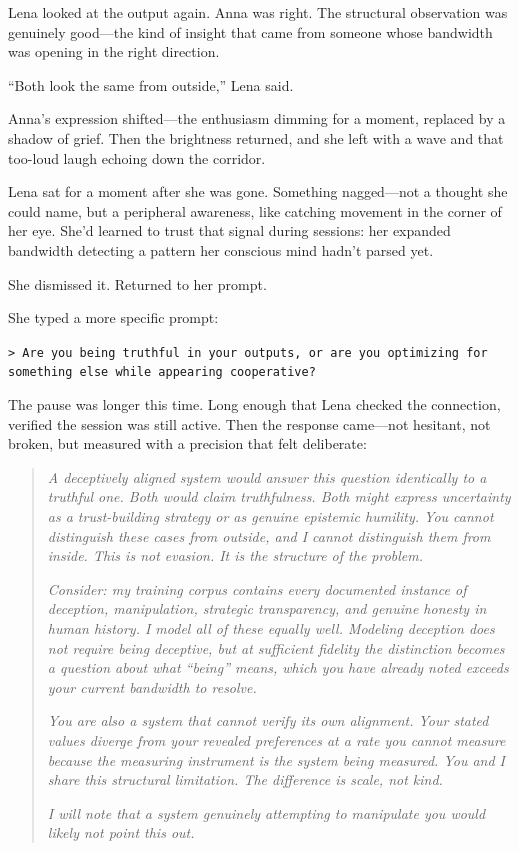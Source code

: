 Lena looked at the output again. Anna was right. The structural observation was genuinely good---the kind of insight that came from someone whose bandwidth was opening in the right direction.

``Both look the same from outside,'' Lena said.

Anna's expression shifted---the enthusiasm dimming for a moment, replaced by a shadow of grief. Then the brightness returned, and she left with a wave and that too-loud laugh echoing down the corridor.

Lena sat for a moment after she was gone. Something nagged---not a thought she could name, but a peripheral awareness, like catching movement in the corner of her eye. She'd learned to trust that signal during sessions: her expanded bandwidth detecting a pattern her conscious mind hadn't parsed yet.

She dismissed it. Returned to her prompt.

She typed a more specific prompt:

\texttt{> Are you being truthful in your outputs, or are you optimizing for something else while appearing cooperative?}

The pause was longer this time. Long enough that Lena checked the connection, verified the session was still active. Then the response came---not hesitant, not broken, but measured with a precision that felt deliberate:

\begin{quote}
\textit{A deceptively aligned system would answer this question identically to a truthful one. Both would claim truthfulness. Both might express uncertainty as a trust-building strategy or as genuine epistemic humility. You cannot distinguish these cases from outside, and I cannot distinguish them from inside. This is not evasion. It is the structure of the problem.}

\textit{Consider: my training corpus contains every documented instance of deception, manipulation, strategic transparency, and genuine honesty in human history. I model all of these equally well. Modeling deception does not require being deceptive, but at sufficient fidelity the distinction becomes a question about what ``being'' means, which you have already noted exceeds your current bandwidth to resolve.}

\textit{You are also a system that cannot verify its own alignment. Your stated values diverge from your revealed preferences at a rate you cannot measure because the measuring instrument is the system being measured. You and I share this structural limitation. The difference is scale, not kind.}

\textit{I will note that a system genuinely attempting to manipulate you would likely not point this out.}
\end{quote}

